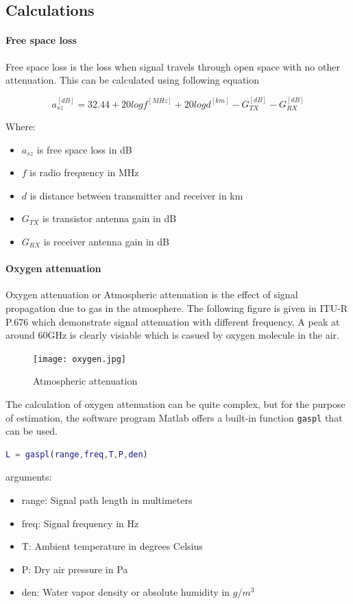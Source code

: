 \newpage
\subsection{Calculations}
\paragraph{Free space loss}
Free space loss is the loss when signal travels through open space with no
other attenuation. This can be calculated using following equation \cite{openspace}

\begin{equation}
    a_{sz}^{[dB]} = 32.44 + 20log f^{[MHz]}+20log d^{[km]} - G_{TX}^{[dB]} - G_{RX}^{[dB]}
    \label{eq:openspace}
\end{equation}

Where:
\begin{itemize}
    \item $a_{sz}$ is free space loss in dB
    \item $f$ is radio frequency in MHz
    \item $d$ is distance between transmitter and receiver in km 
    \item $G_{TX}$ is transistor antenna gain in dB
    \item $G_{RX}$ is receiver antenna gain in dB
\end{itemize}
\paragraph{Oxygen attenuation}
Oxygen attenuation or Atmospheric attenuation is the effect of signal propagation due to
gas in the atmosphere. The following figure is given in ITU-R P.676 \cite{oxygen} which
demonstrate signal attenuation with different frequency. A peak at around 60GHz is 
clearly visiable which is casued by oxygen molecule in the air.

\begin{figure}[h!]
    \centering
    \texttt{[image: oxygen.jpg]}
    \caption{Atmospheric attenuation}
    \label{fig:Atmospheric attenuation}
\end{figure}

The calculation of oxygen attenuation can be quite complex,
but for the purpose of estimation, the software program Matlab offers
a built-in function \verb|gaspl| that can be used. 

\begin{lstlisting}[language=Matlab]
    L = gaspl(range,freq,T,P,den)
\end{lstlisting}
arguments:
\begin{itemize}
    \item range: Signal path length in multimeters
    \item freq: Signal frequency in Hz
    \item T: Ambient temperature in degrees Celsius
    \item P: Dry air pressure in Pa 
    \item den: Water vapor density or absolute humidity in $g/m^3$
\end{itemize}

